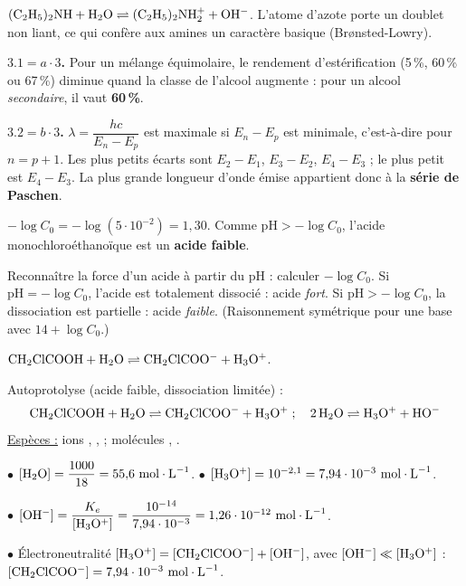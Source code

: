 \documentclass[11pt]{article}
\begin{document}
$\mathrm{(C_2H_5)_2NH + H_2O \rightleftharpoons (C_2H_5)_2NH_2^+ + OH^-}$. L'atome d'azote porte un doublet non liant, ce qui confère aux amines un caractère basique (Br\o nsted-Lowry).

\textbf{$3.1 = a\cdot 3$.} Pour un mélange équimolaire, le rendement d'estérification (5\,\%, 60\,\% ou 67\,\%) diminue quand la classe de l'alcool augmente : pour un alcool \emph{secondaire}, il vaut \textbf{60\,\%}.

\textbf{$3.2 = b\cdot 3$.} $\lambda = \dfrac{hc}{E_n - E_p}$ est maximale si $E_n - E_p$ est minimale, c'est-à-dire pour $n = p+1$. Les plus petits écarts sont $E_2 - E_1$, $E_3 - E_2$, $E_4 - E_3$ ; le plus petit est $E_4 - E_3$. La plus grande longueur d'onde émise appartient donc à la \textbf{série de Paschen}.


 $-\log C_0 = -\log(5\cdot10^{-2}) = 1{,}30$. Comme $\text{pH} > -\log C_0$, l'acide monochloroéthanoïque est un \textbf{acide faible}.

\begin{methode}
Reconnaître la force d'un acide à partir du pH : calculer
$-\log C_0$. Si $\text{pH} = -\log C_0$, l'acide est totalement
dissocié : acide \emph{fort}. Si $\text{pH} > -\log C_0$, la
dissociation est partielle : acide \emph{faible}. (Raisonnement
symétrique pour une base avec $14 + \log C_0$.)
\end{methode}

 $\mathrm{CH_2ClCOOH + H_2O \rightleftharpoons CH_2ClCOO^- + H_3O^+}$.

 Autoprotolyse (acide faible, dissociation limitée) :
\[ \mathrm{CH_2ClCOOH + H_2O \rightleftharpoons CH_2ClCOO^- + H_3O^+} \;;\quad \mathrm{2\,H_2O \rightleftharpoons H_3O^+ + HO^-} \]
\underline{Espèces :} ions , ,  ; molécules , .

$\bullet$ $[\ch{H_2O}] = \dfrac{1000}{18} = 55{,}6\ \text{mol}\cdot\text{L}^{-1}$. \quad $\bullet$ $[\mathrm{H_3O^+}] = 10^{-2{,}1} = 7{,}94\cdot10^{-3}\ \text{mol}\cdot\text{L}^{-1}$.

$\bullet$ $[\ch{OH^-}] = \dfrac{K_e}{[\ch{H_3O^+}]} = \dfrac{10^{-14}}{7{,}94\cdot10^{-3}} = 1{,}26\cdot10^{-12}\ \text{mol}\cdot\text{L}^{-1}$.

$\bullet$ Électroneutralité $[\mathrm{H_3O^+}] = [\mathrm{CH_2ClCOO^-}] + [\mathrm{OH^-}]$, avec $[\mathrm{OH^-}] \ll [\mathrm{H_3O^+}]$ : $[\ch{CH_2ClCOO^-}] = 7{,}94\cdot10^{-3}\ \text{mol}\cdot\text{L}^{-1}$.
\end{document}
